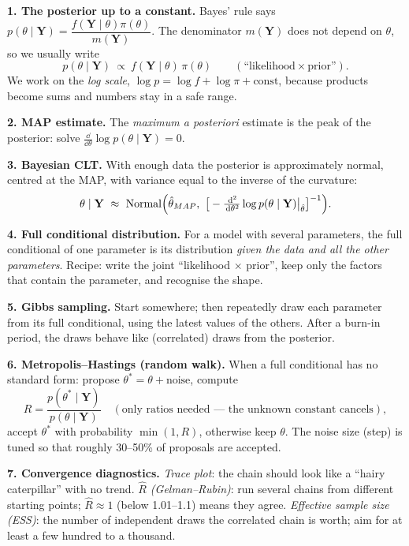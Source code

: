 \documentclass[11pt]{article}
\begin{document}
\begin{recall}
\textbf{1. The posterior up to a constant.} Bayes' rule says
$p(\theta\mid\mathbf Y)=\dfrac{f(\mathbf Y\mid\theta)\pi(\theta)}{m(\mathbf Y)}$. The denominator $m(\mathbf Y)$ does not depend on $\theta$, so we usually write
\[
p(\theta\mid\mathbf Y)\ \propto\ f(\mathbf Y\mid\theta)\,\pi(\theta)\qquad(\text{``likelihood}\times\text{prior''}).
\]
We work on the \emph{log scale}, $\log p=\log f+\log\pi+\text{const}$, because products become sums and numbers stay in a safe range.

\medskip
\textbf{2. MAP estimate.} The \emph{maximum a posteriori} estimate is the peak of the posterior: solve $\frac{\dd}{\dd\theta}\log p(\theta\mid\mathbf Y)=0$.

\medskip
\textbf{3. Bayesian CLT.} With enough data the posterior is approximately normal, centred at the MAP, with variance equal to the inverse of the curvature:
\[
\theta\mid\mathbf Y\ \approx\ \dist{Normal}\Big(\hat\theta_{MAP},\ \big[-\tfrac{\dd^2}{\dd\theta^2}\log p(\theta\mid\mathbf Y)\big|_{\hat\theta}\big]^{-1}\Big).
\]

\medskip
\textbf{4. Full conditional distribution.} For a model with several parameters, the full conditional of one parameter is its distribution \emph{given the data and all the other parameters}. Recipe: write the joint ``likelihood $\times$ prior'', keep only the factors that contain the parameter, and recognise the shape.

\medskip
\textbf{5. Gibbs sampling.} Start somewhere; then repeatedly draw each parameter from its full conditional, using the latest values of the others. After a burn-in period, the draws behave like (correlated) draws from the posterior.

\medskip
\textbf{6. Metropolis--Hastings (random walk).} When a full conditional has no standard form: propose $\theta^*=\theta+\text{noise}$, compute
\[
R=\frac{p(\theta^*\mid\mathbf Y)}{p(\theta\mid\mathbf Y)}\quad(\text{only ratios needed --- the unknown constant cancels}),
\]
accept $\theta^*$ with probability $\min(1,R)$, otherwise keep $\theta$. The noise size (step) is tuned so that roughly 30--50\% of proposals are accepted.

\medskip
\textbf{7. Convergence diagnostics.}
\emph{Trace plot}: the chain should look like a ``hairy caterpillar'' with no trend. \emph{$\hat R$ (Gelman--Rubin)}: run several chains from different starting points; $\hat R\approx1$ (below 1.01--1.1) means they agree. \emph{Effective sample size (ESS)}: the number of independent draws the correlated chain is worth; aim for at least a few hundred to a thousand.
\end{recall}
\end{document}
